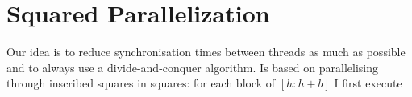\section{Squared Parallelization}\label{squared-parallelization}

Our idea is to reduce synchronisation times between threads as much as possible and to always use a divide-and-conquer algorithm. Is based on parallelising through inscribed squares in squares: for each block of \([h:h+b]\) I first execute 

\FloatBarrier